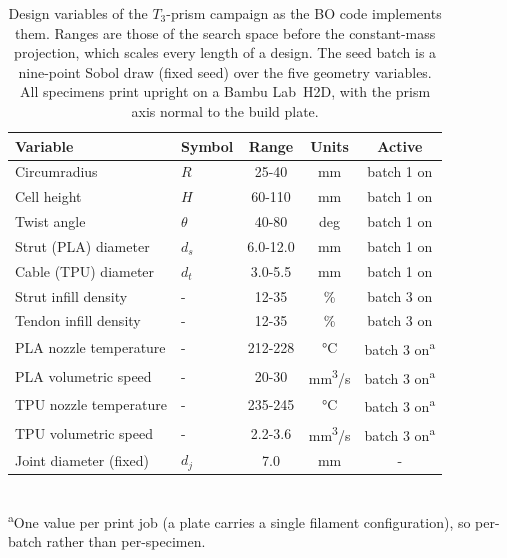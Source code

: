 \documentclass[lineno,nocopyright,upint,varvw,hyphenate]{asmejour}
\begin{document}
\begin{table}[ht]
  \centering
  \caption{Design variables of the $T_3$-prism campaign as the BO code
    implements them. Ranges are those of the search space before the
    constant-mass projection, which scales every length of a design.
    The seed batch is a nine-point Sobol draw (fixed seed) over the five
    geometry variables. All specimens print upright on a Bambu Lab~H2D,
    with the prism axis normal to the build plate.}
  \label{tab:design-vars}
  \small
  \begin{tabular}{@{}llccc@{}}
    \toprule
    Variable & Symbol & Range & Units & Active \\
    \midrule
    Circumradius           & $R$       & 25-40 & mm  & batch 1 on \\
    Cell height            & $H$       & 60-110 & mm  & batch 1 on \\
    Twist angle            & $\theta$  & 40-80 & deg & batch 1 on \\
    Strut (PLA) diameter   & $d_s$     & 6.0-12.0 & mm  & batch 1 on \\
    Cable (TPU) diameter   & $d_t$     & 3.0-5.5 & mm  & batch 1 on \\
    Strut infill density   & -        & 12-35 & \%  & batch 3 on \\
    Tendon infill density  & -        & 12-35 & \%  & batch 3 on \\
    PLA nozzle temperature & -        & 212-228 & \si{\celsius} & batch 3 on\textsuperscript{a} \\
    PLA volumetric speed   & -        & 20-30 & \si{mm^3/s} & batch 3 on\textsuperscript{a} \\
    TPU nozzle temperature & -        & 235-245 & \si{\celsius} & batch 3 on\textsuperscript{a} \\
    TPU volumetric speed   & -        & 2.2-3.6 & \si{mm^3/s} & batch 3 on\textsuperscript{a} \\
    Joint diameter (fixed) & $d_j$     & 7.0 & mm  & - \\
    \bottomrule
  \end{tabular}\\[2pt]
  {\footnotesize \textsuperscript{a}One value per print job (a plate
  carries a single filament configuration), so per-batch rather than
  per-specimen.}
\end{table}%
\end{document}

